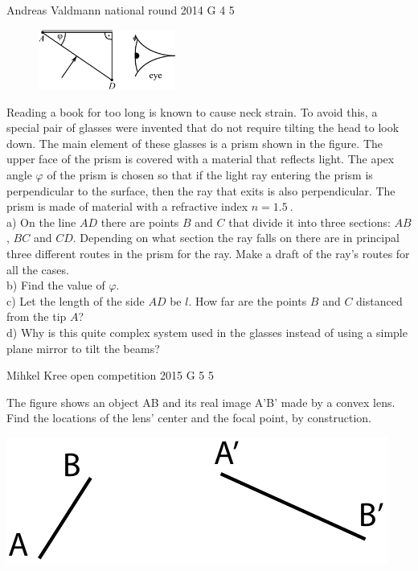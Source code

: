 \documentclass[11pt]{article}
\begin{document}
{Andreas Valdmann} %
{national round} %
{2014} %
{G 4} %
{5} %
{

\ifEngStatement
\begin{figure}
  \begin{center}
    \includegraphics[width=0.4\textwidth]{2014-v3g-04-periskoopprillid_yl_joonis_ing}
  \end{center}
\end{figure}
Reading a book for too long is known to cause neck strain. To avoid this, a special pair of glasses were invented that do not require tilting the head to look down. The main element of these glasses is a prism shown in the figure. The upper face of the prism is covered with a material that reflects light. The apex angle $\varphi$ of the prism is chosen so that if the light ray entering the prism is perpendicular to the surface, then the ray that exits is also perpendicular. The prism is made of material with a refractive index $n=\SI{1,5}{}$.\\
a) On the line $AD$ there are points $B$ and $C$ that divide it into three sections: $AB$, $BC$ and $CD$. Depending on what section the ray falls on there are in principal three different routes in the prism for the ray. Make a draft of the ray’s routes for all the cases. \\
b) Find the value of $\varphi$.\\
c) Let the length of the side $AD$ be $l$. How far are the points $B$ and $C$ distanced from the tip $A$?\\
d) Why is this quite complex system used in the glasses instead of using a simple plane mirror to tilt the beams?
\fi
}

{Mihkel Kree} %
{open competition} %
{2015} %
{G 5} %
{5} %
{

\ifEngStatement
The figure shows an object AB and its real image A’B’ made by a convex lens. Find the locations of the lens’ center and the focal point, by construction.
\begin{center}
 \includegraphics[width=0.7\linewidth]{2015-lahg-05-laatsMihkel}
\end{center}
\fi
}
\end{document}
